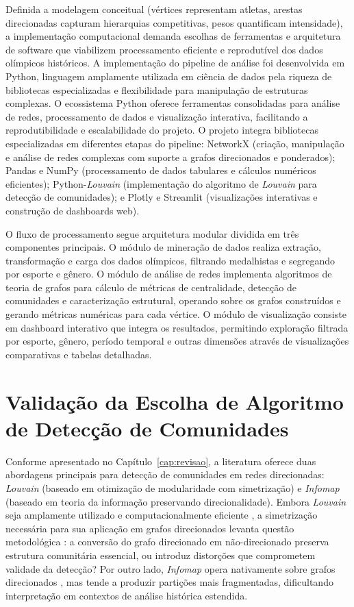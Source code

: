 Definida a modelagem conceitual (vértices representam atletas, arestas direcionadas capturam hierarquias competitivas, pesos quantificam intensidade), a implementação computacional demanda escolhas de ferramentas e arquitetura de software que viabilizem processamento eficiente e reprodutível dos dados olímpicos históricos. A implementação do pipeline de análise foi desenvolvida em Python, linguagem amplamente utilizada em ciência de dados pela riqueza de bibliotecas especializadas e flexibilidade para manipulação de estruturas complexas. O ecossistema Python oferece ferramentas consolidadas para análise de redes, processamento de dados e visualização interativa, facilitando a reprodutibilidade e escalabilidade do projeto. O projeto integra bibliotecas especializadas em diferentes etapas do pipeline: NetworkX (criação, manipulação e análise de redes complexas com suporte a grafos direcionados e ponderados); Pandas e NumPy (processamento de dados tabulares e cálculos numéricos eficientes); Python-\textit{Louvain} (implementação do algoritmo de \textit{Louvain} para detecção de comunidades); e Plotly e Streamlit (visualizações interativas e construção de dashboards web).

O fluxo de processamento segue arquitetura modular dividida em três componentes principais. O módulo de mineração de dados realiza extração, transformação e carga dos dados olímpicos, filtrando medalhistas e segregando por esporte e gênero. O módulo de análise de redes implementa algoritmos de teoria de grafos para cálculo de métricas de centralidade, detecção de comunidades e caracterização estrutural, operando sobre os grafos construídos e gerando métricas numéricas para cada vértice. O módulo de visualização consiste em dashboard interativo que integra os resultados, permitindo exploração filtrada por esporte, gênero, período temporal e outras dimensões através de visualizações comparativas e tabelas detalhadas.

\section{Validação da Escolha de Algoritmo de Detecção de Comunidades}
\label{sec:validacao_louvain}

Conforme apresentado no Capítulo~\ref{cap:revisao}, a literatura oferece duas abordagens principais para detecção de comunidades em redes direcionadas: \textit{Louvain} \cite{Blondel2008Louvain} (baseado em otimização de modularidade com simetrização) e \textit{Infomap} \cite{Rosvall2008Infomap} (baseado em teoria da informação preservando direcionalidade). Embora \textit{Louvain} seja amplamente utilizado e computacionalmente eficiente \cite{Blondel2008Louvain}, a simetrização necessária para sua aplicação em grafos direcionados levanta questão metodológica \cite{Leicht2008CommunityStructure}: a conversão do grafo direcionado em não-direcionado preserva estrutura comunitária essencial, ou introduz distorções que comprometem validade da detecção? Por outro lado, \textit{Infomap} opera nativamente sobre grafos direcionados \cite{Rosvall2008Infomap}, mas tende a produzir partições mais fragmentadas, dificultando interpretação em contextos de análise histórica estendida.

